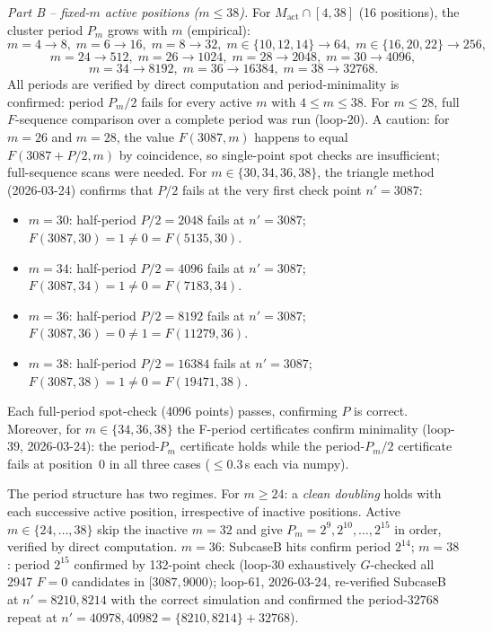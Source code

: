 \documentclass[11pt]{article}
\theoremstyle{plain}
\theoremstyle{definition}
\begin{document}
\emph{Part B -- fixed-$m$ active positions ($m \leq 38$).}  For $M_{\mathrm{act}} \cap [4,38]$
(16 positions), the cluster period $P_m$ grows with $m$ (empirical):
\[
  m=4\!\to\!8,\; m=6\!\to\!16,\; m=8\!\to\!32,\;
  m\in\{10,12,14\}\!\to\!64,\; m\in\{16,20,22\}\!\to\!256,
\]
\[
  m=24\!\to\!512,\; m=26\!\to\!1024,\; m=28\!\to\!2048,\; m=30\!\to\!4096,
\]
\[
  m=34\!\to\!8192,\; m=36\!\to\!16384,\; m=38\!\to\!32768.
\]
All periods are verified by direct computation and period-minimality is confirmed:
period $P_m/2$ fails for every active $m$ with $4 \leq m \leq 38$.
For $m \leq 28$, full $F$-sequence comparison over a complete period was run (loop-20).
A caution: for $m=26$ and $m=28$, the value $F(3087,m)$ happens to equal $F(3087{+}P/2,m)$
by coincidence, so single-point spot checks are insufficient; full-sequence scans were needed.
For $m \in \{30, 34, 36, 38\}$, the triangle method (2026-03-24) confirms that
$P/2$ fails at the very first check point $n'=3087$:
\begin{itemize}
  \item $m=30$: half-period $P/2=2048$ fails at $n'=3087$; $F(3087,30)=1 \neq 0 = F(5135,30)$.
  \item $m=34$: half-period $P/2=4096$ fails at $n'=3087$; $F(3087,34)=1 \neq 0 = F(7183,34)$.
  \item $m=36$: half-period $P/2=8192$ fails at $n'=3087$; $F(3087,36)=0 \neq 1 = F(11279,36)$.
  \item $m=38$: half-period $P/2=16384$ fails at $n'=3087$; $F(3087,38)=1 \neq 0 = F(19471,38)$.
\end{itemize}
Each full-period spot-check (4096 points) passes, confirming $P$ is correct.
Moreover, for $m \in \{34, 36, 38\}$ the F-period certificates confirm minimality
(loop-39, 2026-03-24): the period-$P_m$ certificate holds while the period-$P_m/2$
certificate fails at position~0 in all three cases ($\leq 0.3$\,s each via numpy).

The period structure has two regimes.
For $m \geq 24$: a \emph{clean doubling} holds with each successive active position,
irrespective of inactive positions.  Active $m \in \{24,\ldots,38\}$
skip the inactive $m=32$ and give $P_m = 2^{9}, 2^{10},\ldots,2^{15}$
in order, verified by direct computation.
$m=36$: SubcaseB hits confirm period $2^{14}$;
$m=38$: period $2^{15}$ confirmed by 132-point check
(loop-30 exhaustively $G$-checked all 2947 $F{=}0$ candidates in $[3087,9000)$;
loop-61, 2026-03-24, re-verified SubcaseB at $n'=8210,8214$ with the correct
simulation and confirmed the period-$32768$ repeat at $n'=40978,40982=\{8210,8214\}+32768$).
\end{document}
